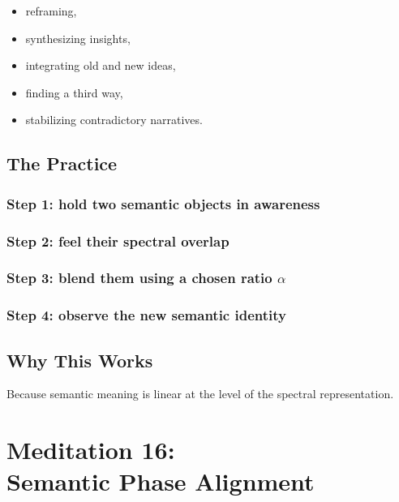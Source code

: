 \documentclass[12pt]{article}
\begin{document}
\begin{itemize}
    \item reframing,
    \item synthesizing insights,
    \item integrating old and new ideas,
    \item finding a third way,
    \item stabilizing contradictory narratives.
\end{itemize}

\section{The Practice}

\subsection*{Step 1: hold two semantic objects in awareness}

\subsection*{Step 2: feel their spectral overlap}

\subsection*{Step 3: blend them using a chosen ratio $\alpha$}

\subsection*{Step 4: observe the new semantic identity}

\section{Why This Works}

Because semantic meaning is linear at the level of the spectral representation.

\newpage


\chapter{Meditation 16:\\ Semantic Phase Alignment}
\end{document}

